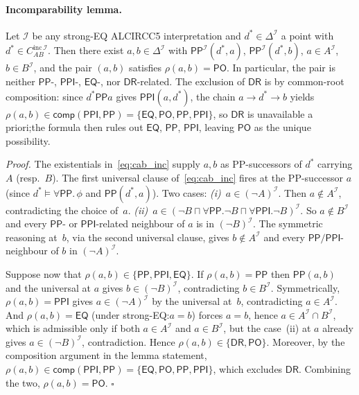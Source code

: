 \documentclass[11pt]{article}
\newcommand{\EQ}{\mathsf{EQ}}
\newcommand{\PP}{\mathsf{PP}}
\newcommand{\PPI}{\mathsf{PPI}}
\newcommand{\PO}{\mathsf{PO}}
\newcommand{\DR}{\mathsf{DR}}
\begin{document}
\paragraph{Incomparability lemma.}  Let \(\mathcal I\) be any
strong-EQ ALCIRCC{5} interpretation and \(d^* \in \Delta^\mathcal I\)
a point with \(d^* \in C_{AB}^{\mathrm{inc}\,\mathcal I}\).  Then
there exist \(a, b \in \Delta^\mathcal I\) with \(\PP^\mathcal I(d^*, a)\),
\(\PP^\mathcal I(d^*, b)\), \(a \in A^\mathcal I\), \(b \in B^\mathcal I\),
and the pair \((a, b)\) satisfies \(\rho(a, b) = \PO\).  In particular,
the pair is neither \(\PP\)-, \(\PPI\)-, \(\EQ\)-, nor \(\DR\)-related.
The exclusion of \(\DR\) is by common-root composition: since
\(d^* \PP a\) gives \(\PPI(a, d^*)\), the chain
\(a \to d^* \to b\) yields
\(\rho(a, b) \in \mathsf{comp}(\PPI, \PP) = \{\EQ, \PO, \PP, \PPI\}\),
so \(\DR\) is unavailable a priori;\@ the formula then rules out
\(\EQ\), \(\PP\), \(\PPI\), leaving \(\PO\) as the unique possibility.

\emph{Proof.}  The existentials in~\eqref{eq:cab_inc} supply
\(a, b\) as PP-successors of \(d^*\) carrying \(A\) (resp.~\(B\)).
The first universal clause of~\eqref{eq:cab_inc} fires at the
PP-successor \(a\) (since \(d^* \models \forall\PP.\,\phi\) and
\(\PP(d^*, a)\)).  Two cases:
\emph{(i)}~\(a \in (\neg A)^\mathcal I\).  Then \(a \notin A^\mathcal I\),
contradicting the choice of~\(a\).
\emph{(ii)}~\(a \in (\neg B \sqcap \forall\PP.\neg B \sqcap
\forall\PPI.\neg B)^\mathcal I\).
So \(a \notin B^\mathcal I\) and every \(\PP\)- or \(\PPI\)-related
neighbour of \(a\) is in \((\neg B)^\mathcal I\).
The symmetric reasoning at~\(b\), via the second universal clause,
gives \(b \notin A^\mathcal I\) and every \(\PP/\PPI\)-neighbour of
\(b\) in \((\neg A)^\mathcal I\).

Suppose now that \(\rho(a, b) \in \{\PP, \PPI, \EQ\}\).  If
\(\rho(a, b) = \PP\) then \(\PP(a, b)\) and the universal at \(a\)
gives \(b \in (\neg B)^\mathcal I\), contradicting \(b \in B^\mathcal I\).
Symmetrically, \(\rho(a, b) = \PPI\) gives \(a \in (\neg A)^\mathcal I\)
by the universal at~\(b\), contradicting \(a \in A^\mathcal I\).
And \(\rho(a, b) = \EQ\) (under strong-EQ:\@ \(a = b\)) forces
\(a = b\), hence \(a \in A^\mathcal I \cap B^\mathcal I\), which is
admissible only if both \(a \in A^\mathcal I\) and \(a \in B^\mathcal I\),
but the case~(ii) at \(a\) already gives \(a \in (\neg B)^\mathcal I\),
contradiction.  Hence \(\rho(a, b) \in \{\DR, \PO\}\).  Moreover, by
the composition argument in the lemma statement,
\(\rho(a, b) \in \mathsf{comp}(\PPI, \PP) = \{\EQ, \PO, \PP, \PPI\}\),
which excludes \(\DR\).  Combining the two,
\(\rho(a, b) = \PO\).  \(\square\)
\end{document}
